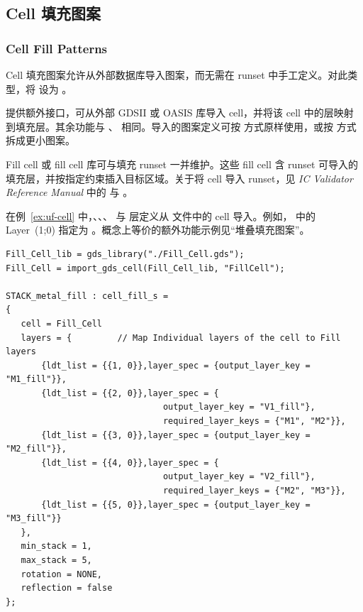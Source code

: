 \subsection{Cell 填充图案}
\subsubsection*{Cell Fill Patterns}

Cell 填充图案允许从外部数据库导入图案，而无需在 runset 中手工定义。对此类型，将  设为 。

 提供额外接口，可从外部 GDSII 或 OASIS 库导入 cell，并将该 cell 中的层映射到填充层。其余功能与 、 相同。导入的图案定义可按  方式原样使用，或按  方式拆成更小图案。

Fill cell 或 fill cell 库可与填充 runset 一并维护。这些 fill cell 含 runset 可导入的填充层，并按指定约束插入目标区域。关于将 cell 导入 runset，见 \textit{IC Validator Reference Manual} 中的  与 。

在例~\ref{ex:uf-cell} 中，、、、 与  层定义从  文件中的  cell 导入。例如， 中的 Layer~(1;0) 指定为 。概念上等价的额外功能示例见“堆叠填充图案”。

\begin{lstlisting}[style=pxl,caption={Cell 填充图案示例},label={ex:uf-cell}]
Fill_Cell_lib = gds_library("./Fill_Cell.gds");
Fill_Cell = import_gds_cell(Fill_Cell_lib, "FillCell");

STACK_metal_fill : cell_fill_s =
{
   cell = Fill_Cell
   layers = {         // Map Individual layers of the cell to Fill layers
       {ldt_list = {{1, 0}},layer_spec = {output_layer_key = "M1_fill"}},
       {ldt_list = {{2, 0}},layer_spec = {
                               output_layer_key = "V1_fill"},
                               required_layer_keys = {"M1", "M2"}},
       {ldt_list = {{3, 0}},layer_spec = {output_layer_key = "M2_fill"}},
       {ldt_list = {{4, 0}},layer_spec = {
                               output_layer_key = "V2_fill"},
                               required_layer_keys = {"M2", "M3"}},
       {ldt_list = {{5, 0}},layer_spec = {output_layer_key = "M3_fill"}}
   },
   min_stack = 1,
   max_stack = 5,
   rotation = NONE,
   reflection = false
};
\end{lstlisting}


